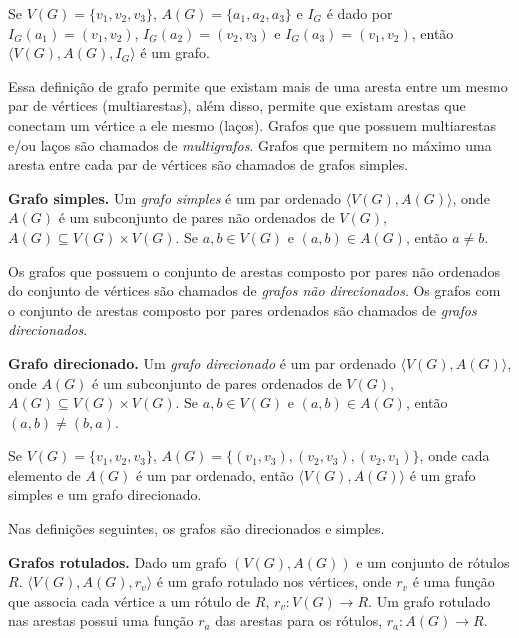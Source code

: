 \begin{example}
Se $V(G) = \{v_1, v_2, v_3\}$, $A(G) = \{a_1, a_2, a_3\}$ e $I_G$ é dado por $I_G(a_1) = (v_1, v_2)$, $I_G(a_2) = (v_2, v_3)$ e $I_G(a_3) = (v_1, v_2)$, então $\langle V(G), A(G), I_G\rangle$ é um grafo.
\end{example}

Essa definição de grafo permite que existam mais de uma aresta entre um mesmo par de vértices (multiarestas), além disso, permite que existam arestas que conectam um vértice a ele mesmo (laços). Grafos que que possuem multiarestas e/ou laços são chamados de \textit{multigrafos}. Grafos que permitem no máximo uma aresta entre cada par de vértices são chamados de grafos simples.

\begin{definition}{\textbf{Grafo simples.}}
Um \textit{grafo simples} é um par ordenado $\langle V(G), A(G)\rangle$, onde $A(G)$ é um subconjunto de pares não ordenados de $V(G)$, $A(G) \subseteq V(G) \times V(G)$. Se $a, b \in V(G)$ e $(a, b) \in A(G)$, então $a \neq b$.
\end{definition}

Os grafos que possuem o conjunto de arestas composto por pares não ordenados do conjunto de vértices são chamados de \textit{grafos não direcionados}. Os grafos com o conjunto de arestas composto por pares ordenados são chamados de \textit{grafos direcionados}.

\begin{definition}{\textbf{Grafo direcionado.}}
Um \textit{grafo direcionado} é um par ordenado $\langle V(G), A(G)\rangle$, onde $A(G)$ é um subconjunto de pares ordenados de $V(G)$, $A(G) \subseteq V(G) \times V(G)$. Se $a, b \in V(G)$ e $(a, b) \in A(G)$, então $(a, b) \neq (b, a)$.
\end{definition}

\begin{example}
\label{ex:grafo_ds}
Se $V(G) = \{v_1, v_2, v_3\}$, $A(G) = \{(v_1, v_3), (v_2, v_3), (v_2, v_1)\}$, onde cada elemento de $A(G)$ é um par ordenado, então $\langle V(G), A(G)\rangle$ é um grafo simples e um grafo direcionado.
\end{example}

Nas definições seguintes, os grafos são direcionados e simples. 

\begin{definition}{\textbf{Grafos rotulados.}}
Dado um grafo $(V(G), A(G))$ e um conjunto de rótulos $R$. $\langle V(G), A(G), r_v\rangle$ é um grafo rotulado nos vértices, onde $r_v$ é uma função que associa cada vértice a um rótulo de $R$, $r_v: V(G) \rightarrow R$. Um grafo rotulado nas arestas possui uma função $r_a$ das arestas para os rótulos, $r_a: A(G) \rightarrow R$.
\end{definition}

